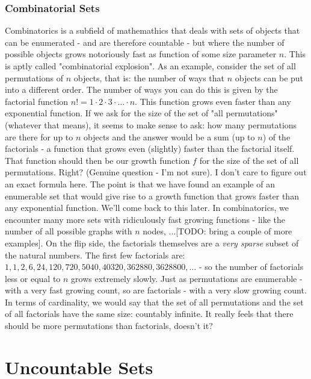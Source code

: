 \documentclass[12pt]{article}
\begin{document}
\subsubsection{Combinatorial Sets}
Combinatorics is a subfield of mathemathics that deals with sets of objects that can be enumerated - and are therefore countable - but where the number of possible objects grows notoriously fast as function of some size parameter $n$. This is aptly called "combinatorial explosion". As an example, consider the set of all permutations of $n$ objects, that is: the number of ways that $n$ objects can be put into a different order. The number of ways you can do this is given by the factorial function $n! = 1\cdot 2\cdot 3\cdot \ldots \cdot n$. This function grows even faster than any exponential function. If we ask for the size of the set of "all permutations" (whatever that means), it seems to make sense to ask: how many permutations are there for up to $n$ objects and the answer would be a sum (up to $n$) of the factorials - a function that grows even (slightly) faster than the factorial itself. That function should then be our growth function $f$ for the size of the set of all permutations. Right? (Genuine question - I'm not sure). I don't care to figure out an exact formula here. The point is that we have found an example of an enumerable set that would give rise to a growth function that grows faster than any exponential function. We'll come back to this later. In combinatorics, we encounter many more sets with ridiculously fast growing functions - like the number of all possible graphs with $n$ nodes, ...[TODO: bring a couple of more examples]. On the flip side, the factorials themselves are a \emph{very sparse} subset of the natural numbers. The first few factorials are: $1,1,2,6,24,120,720,5040,40320,362880,3628800,\ldots$ - so the number of factorials less or equal to $n$ grows extremely slowly. Just as permutations are enumerable - with a very fast growing count, so are factorials - with a very slow growing count. In terms of cardinality, we would say that the set of all permutations and the set of all factorials have the same size: countably infinite. It really feels that there should be more permutations than factorials, doesn't it?


\section{Uncountable Sets}
\end{document}
